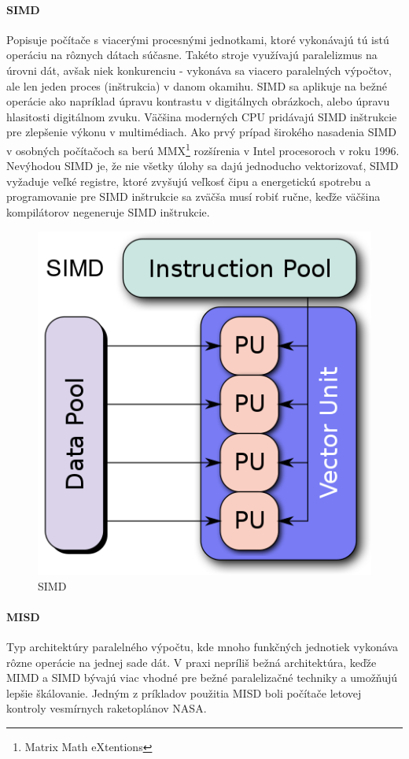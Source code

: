 \documentclass[11pt,a4paper]{report}
\begin{document}
\paragraph{SIMD} Popisuje počítače s viacerými procesnými jednotkami, ktoré vykonávajú tú istú operáciu na rôznych dátach súčasne. Takéto stroje využívajú paralelizmus na úrovni dát, avšak niek konkurenciu - vykonáva sa viacero paralelných výpočtov, ale len jeden proces (inštrukcia) v danom okamihu. SIMD sa aplikuje na bežné operácie ako napríklad úpravu kontrastu v digitálnych obrázkoch, alebo úpravu hlasitosti  digitálnom zvuku. Väčšina moderných CPU pridávajú SIMD inštrukcie pre zlepšenie výkonu v multimédiach. Ako prvý prípad širokého nasadenia SIMD v osobných počítačoch sa berú MMX\footnote{Matrix Math eXtentions} rozšírenia v Intel procesoroch v roku 1996. Nevýhodou SIMD je, že nie všetky úlohy sa dajú jednoducho vektorizovať, SIMD vyžaduje veľké registre, ktoré zvyšujú veľkosť čipu a energetickú spotrebu a programovanie pre SIMD inštrukcie sa zväčša musí robiť ručne, keďže väčšina kompilátorov negeneruje SIMD inštrukcie.

\begin{figure}[ht]
        \centering
        \includegraphics[scale=0.25]{images/SIMD}
        \caption{SIMD}
        \label{SIMD:}
\end{figure}
\newpage

\paragraph{MISD} Typ architektúry paralelného výpočtu, kde mnoho funkčných jednotiek vykonáva rôzne operácie na jednej sade dát. V praxi nepríliš bežná architektúra, keďže MIMD a SIMD bývajú viac vhodné pre bežné paralelizačné techniky a umožňujú lepšie škálovanie. Jedným z príkladov použitia MISD boli počítače letovej kontroly vesmírnych raketoplánov NASA.
\end{document}
